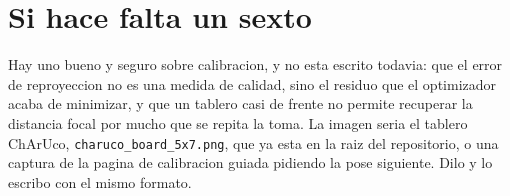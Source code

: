 \documentclass[11pt,a4paper]{article}
\begin{document}
\clearpage
\section*{Si hace falta un sexto}

Hay uno bueno y seguro sobre calibracion, y no esta escrito todavia: que el
error de reproyeccion no es una medida de calidad, sino el residuo que el
optimizador acaba de minimizar, y que un tablero casi de frente no permite
recuperar la distancia focal por mucho que se repita la toma. La imagen seria
el tablero ChArUco, \texttt{charuco\_board\_5x7.png}, que ya esta en la raiz
del repositorio, o una captura de la pagina de calibracion guiada pidiendo la
pose siguiente. Dilo y lo escribo con el mismo formato.
\end{document}
